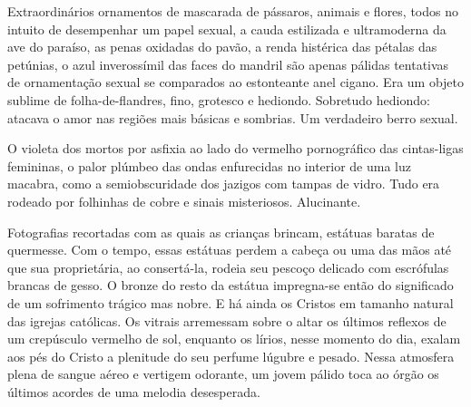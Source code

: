 
Extraordinários ornamentos de mascarada de pássaros, animais e flores, todos
no intuito de desempenhar um papel sexual, a cauda estilizada e ultramoderna
da ave do paraíso, as penas oxidadas do pavão, a renda histérica das pétalas
das petúnias, o azul inverossímil das faces do mandril são apenas pálidas
tentativas de ornamentação sexual se comparados ao estonteante anel cigano.
Era um objeto sublime de folha-de-flandres, fino, grotesco e hediondo.
Sobretudo hediondo: atacava o amor nas regiões mais básicas e sombrias. Um
verdadeiro berro sexual.


O violeta dos mortos por asfixia ao lado do vermelho pornográfico das
cintas-ligas femininas, o palor plúmbeo das ondas enfurecidas no interior de
uma luz macabra, como a semiobscuridade dos jazigos com tampas de vidro. Tudo
era rodeado por folhinhas de cobre e sinais misteriosos. Alucinante.


Fotografias recortadas com as quais as crianças brincam, estátuas baratas de
quermesse. Com o tempo, essas estátuas perdem a cabeça ou uma das mãos até
que sua proprietária, ao consertá-la, rodeia seu pescoço delicado com
escrófulas brancas de gesso. O bronze do resto da estátua impregna-se então
do significado de um sofrimento trágico mas nobre. E há ainda os Cristos em
tamanho natural das igrejas católicas. Os vitrais arremessam sobre o altar os
últimos reflexos de um crepúsculo vermelho de sol, enquanto os lírios, nesse
momento do dia, exalam aos pés do Cristo a plenitude do seu perfume lúgubre e
pesado. Nessa atmosfera plena de sangue aéreo e vertigem odorante, um jovem
pálido toca ao órgão os últimos acordes de uma melodia desesperada.

